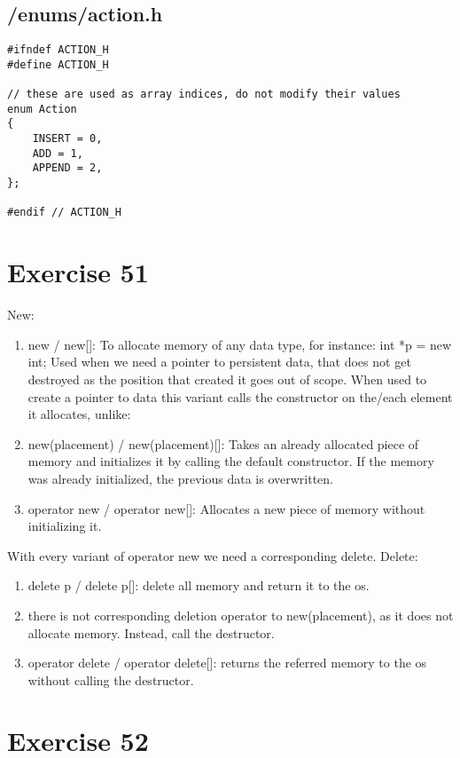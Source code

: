 \documentclass{article}
\begin{document}
\subsection*{/enums/action.h}
\begin{verbatim}
#ifndef ACTION_H
#define ACTION_H

// these are used as array indices, do not modify their values
enum Action
{
    INSERT = 0,
    ADD = 1,
    APPEND = 2,
};

#endif // ACTION_H
\end{verbatim}


\section*{Exercise 51}
New: 
\newline
\begin{enumerate}
    \item new / new[]: To allocate memory of any data type, for instance: int *p = new int; Used when we need a pointer to persistent data, that does not get destroyed as the position that created it goes out of scope. When used to create a pointer to data this variant calls the constructor on the/each element it allocates, unlike:
    \item new(placement) / new(placement)[]: Takes an already allocated piece of memory and initializes it by calling the default constructor. If the memory was already initialized, the previous data is overwritten.
    \item operator new / operator new[]: Allocates a new piece of memory without initializing it.
\end{enumerate}
With every variant of operator new we need a corresponding delete.
\newline
Delete: 
\begin{enumerate}
    \item delete p / delete p[]: delete all memory and return it to the os.
    \item there is not corresponding deletion operator to new(placement), as it does not allocate memory. Instead, call the destructor.
    \item operator delete / operator delete[]: returns the referred memory to the os without calling the destructor.
\end{enumerate}


\section*{Exercise 52}
\end{document}

